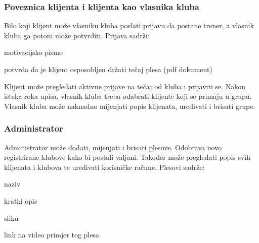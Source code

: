 			\subsubsection{Poveznica klijenta i klijenta kao vlasnika kluba}
			
		Bilo koji klijent može vlasniku kluba poslati prijavu da postane trener, a vlasnik kluba ga potom može  potvrditi. Prijava sadrži:
		
			\begin{packed_item}
				\item motivacijsko pismo
				\item potvrda da je klijent osposobljen držati tečaj plesa (pdf dokument)
			\end{packed_item}
		Klijent može pregledati aktivne prijave na tečaj od kluba i prijaviti se. Nakon isteka roka upisa, vlasnik kluba treba odabrati klijente koji se primaju u grupu. Vlasnik kluba može naknadno mijenjati popis klijenata, uređivati i brisati grupe.
		
			\bigskip
			
			\subsubsection{Administrator}
			
			Administrator može dodati, mijenjati i brisati plesove. Odobrava novo registrirane klubove kako bi postali valjani. Također može pregledati popis svih klijenata i klubova te uređivati korisničke račune.
			Plesovi sadrže:
			\begin{packed_item}
				\item naziv
				\item kratki opis
				\item sliku
				\item link na video primjer tog plesa
			\end{packed_item}